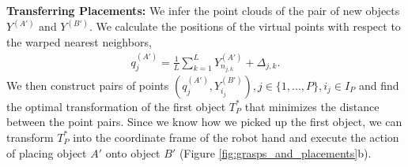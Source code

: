 \documentclass{article}
\newcommand{\pcx}[1]{\mathrm{X}^{(#1)}}
\begin{document}
\textbf{Transferring Placements:} We infer the point clouds of the pair of new objects $Y^{(A')}$ and $Y^{(B')}$. We calculate the positions of the virtual points with respect to the warped nearest neighbors,
\begin{align}
    q^{(A')}_j = \frac{1}{L} \sum_{k=1}^L Y^{(A')}_{n_{j,k}} + \Delta_{j,k}.
\end{align}
We then construct pairs of points $(q^{(A')}_j, Y^{(B')}_{i_j}), j \in \{1, ..., P\}, i_j \in I_P$ and find the optimal transformation of the first object $T^*_P$ that minimizes the distance between the point pairs. Since we know how we picked up the first object, we can transform $T^*_P$ into the coordinate frame of the robot hand and execute the action of placing object $A'$ onto object $B'$ (Figure \ref{fig:grasps_and_placements}b).





\end{document}
